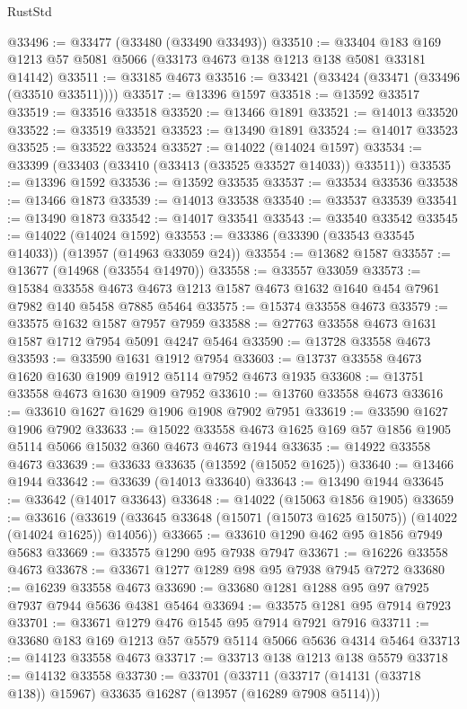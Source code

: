\begin{lexlean}{RustStd}
\begin{coremodule}
@33496 := @33477 (@33480 (@33490 @33493))
@33510 := @33404 @183 @169 @1213 @57 @5081 @5066 (@33173 @4673 @138 @1213 @138 @5081 @33181 @14142)
@33511 := @33185 @4673
@33516 := @33421 (@33424 (@33471 (@33496 (@33510 @33511))))
@33517 := @13396 @1597
@33518 := @13592 @33517
@33519 := @33516 @33518
@33520 := @13466 @1891
@33521 := @14013 @33520
@33522 := @33519 @33521
@33523 := @13490 @1891
@33524 := @14017 @33523
@33525 := @33522 @33524
@33527 := @14022 (@14024 @1597)
@33534 := @33399 (@33403 (@33410 (@33413 (@33525 @33527 @14033)) @33511))
@33535 := @13396 @1592
@33536 := @13592 @33535
@33537 := @33534 @33536
@33538 := @13466 @1873
@33539 := @14013 @33538
@33540 := @33537 @33539
@33541 := @13490 @1873
@33542 := @14017 @33541
@33543 := @33540 @33542
@33545 := @14022 (@14024 @1592)
@33553 := @33386 (@33390 (@33543 @33545 @14033)) (@13957 (@14963 @33059 @24))
@33554 := @13682 @1587
@33557 := @13677 (@14968 (@33554 @14970))
@33558 := @33557 @33059
@33573 := @15384
    @33558
    @4673
    @4673
    @1213
    @1587
    @4673
    @1632
    @1640
    @454
    @7961
    @7982
    @140
    @5458
    @7885
    @5464
@33575 := @15374 @33558 @4673
@33579 := @33575 @1632 @1587 @7957 @7959
@33588 := @27763 @33558 @4673 @1631 @1587 @1712 @7954 @5091 @4247 @5464
@33590 := @13728 @33558 @4673
@33593 := @33590 @1631 @1912 @7954
@33603 := @13737 @33558 @4673 @1620 @1630 @1909 @1912 @5114 @7952 @4673 @1935
@33608 := @13751 @33558 @4673 @1630 @1909 @7952
@33610 := @13760 @33558 @4673
@33616 := @33610 @1627 @1629 @1906 @1908 @7902 @7951
@33619 := @33590 @1627 @1906 @7902
@33633 := @15022 @33558 @4673 @1625 @169 @57 @1856 @1905 @5114 @5066 @15032 @360 @4673 @4673 @1944
@33635 := @14922 @33558 @4673
@33639 := @33633 @33635 (@13592 (@15052 @1625))
@33640 := @13466 @1944
@33642 := @33639 (@14013 @33640)
@33643 := @13490 @1944
@33645 := @33642 (@14017 @33643)
@33648 := @14022 (@15063 @1856 @1905)
@33659 := @33616
    (@33619 (@33645 @33648 (@15071 (@15073 @1625 @15075)) (@14022 (@14024 @1625)) @14056))
@33665 := @33610 @1290 @462 @95 @1856 @7949 @5683
@33669 := @33575 @1290 @95 @7938 @7947
@33671 := @16226 @33558 @4673
@33678 := @33671 @1277 @1289 @98 @95 @7938 @7945 @7272
@33680 := @16239 @33558 @4673
@33690 := @33680 @1281 @1288 @95 @97 @7925 @7937 @7944 @5636 @4381 @5464
@33694 := @33575 @1281 @95 @7914 @7923
@33701 := @33671 @1279 @476 @1545 @95 @7914 @7921 @7916
@33711 := @33680 @183 @169 @1213 @57 @5579 @5114 @5066 @5636 @4314 @5464
@33713 := @14123 @33558 @4673
@33717 := @33713 @138 @1213 @138 @5579
@33718 := @14132 @33558
@33730 := @33701
    (@33711 (@33717 (@14131 (@33718 @138)) @15967) @33635 @16287 (@13957 (@16289 @7908 @5114)))

\end{coremodule}
\end{lexlean}

